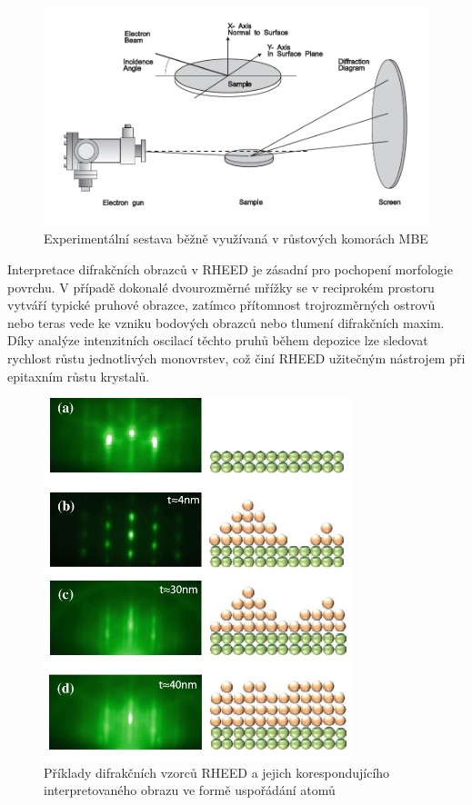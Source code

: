 \documentclass[a4paper,11pt]{article}
\begin{document}
\begin{figure}[H]
	\centering
	\includegraphics[width=1\textwidth]{images/setup1.png}
	\caption{Experimentální sestava běžně využívaná v růstových komorách MBE}
\end{figure}

Interpretace difrakčních obrazců v RHEED je zásadní pro pochopení morfologie povrchu. V případě dokonalé dvourozměrné mřížky se v reciprokém prostoru vytváří typické pruhové obrazce, zatímco přítomnost trojrozměrných ostrovů nebo teras vede ke vzniku bodových obrazců nebo tlumení difrakčních maxim. Díky analýze intenzitních oscilací těchto pruhů během depozice lze sledovat rychlost růstu jednotlivých monovrstev, což činí RHEED užitečným nástrojem při epitaxním růstu krystalů.\\

\begin{figure}[H]
	\centering
	\includegraphics[width=0.8\textwidth]{images/interpretation.png}
	\caption{Příklady difrakčních vzorců RHEED a jejich korespondujícího interpretovaného obrazu ve formě uspořádání atomů}
\end{figure}
\end{document}
